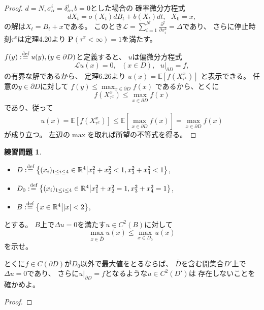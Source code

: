 \documentclass[uplatex]{jsarticle}
\theoremstyle{definition}
\newtheorem{prob}[prob]{練習問題}
\def\R{\mathbb{R}}
\def\P{\mathbf{P}}
\def\E{\mathbb{E}}
\def\mcL{\mathcal{L}}
\def\dfn{:\overset{\mbox{{\scriptsize def}}}{=}}
\begin{document}
\begin{proof}
  \(d = N, \sigma_\alpha^i = \delta_\alpha^i, b=0\)とした場合の
  確率微分方程式
  \[
  dX_t = \sigma (X_t)dB_t + b(X_t)dt, \ \ \ X_0 = x,
  \]
  の解は\(X_t = B_t + x\)である。
  このとき\(\mcL = \sum_{i=1}^N \frac{\partial^2}{\partial x_i^2} = \Delta\)であり、
  さらに停止時刻\(\tau^x\)は定理4.20より
  \(\P(\tau^x < \infty) = 1\)を満たす。

  \(f(y) \dfn u(y) , (y\in \partial D)\)と定義すると、
  \(u\)は偏微分方程式
  \[
  \mcL u(x) = 0, \ \ \ (x\in D), \ \ \ u|_{\partial D} = f,
  \]
  の有界な解であるから、
  定理6.26より
  \(u(x) = \E\left[ f(X_{\tau^x}^x) \right]\)
  と表示できる。
  任意の\(y\in \partial D\)に対して
  \(f(y) \leq \max_{x\in \partial D}f(x)\)
  であるから、とくに
  \[f(X_{\tau^x}^x) \leq \max_{x\in \partial D}f(x)\]
  であり、従って
  \[
  u(x) = \E\left[ f(X_{\tau^x}^x) \right]
  \leq \E\left[ \max_{x\in \partial D}f(x) \right]
  = \max_{x\in \partial D}f(x)
  \]
  が成り立つ。
  左辺の\(\max\)を取れば所望の不等式を得る。
\end{proof}












\begin{prob}\label{prob: 6.8}
  \
  \begin{itemize}
    \item
    \(D \dfn \left\{ (x_i)_{1\leq i \leq 4}\in \R^4 \middle|
    x_1^2 + x_2^2 < 1 , x_3^2 + x_4^2 < 1\right\}\),
    \item
    \(D_0 \dfn \left\{ (x_i)_{1\leq i \leq 4}\in \R^4 \middle|
    x_1^2 + x_2^2 = 1 , x_3^2 + x_4^2 = 1\right\}\),
    \item
    \(B \dfn \left\{ x \in \R^4 \middle| |x| < 2 \right\}\),
  \end{itemize}
  とする。
  \(B\)上で\(\Delta u = 0\)を満たす\(u\in C^2(B)\)に対して
  \[
  \max_{x\in \bar{D}} u(x) \leq \max_{x\in D_0}u(x)
  \]
  を示せ。

  とくに\(f\in C(\partial D)\)が\(D_0\)以外で最大値をとるならば、
  \(\bar{D}\)を含む開集合\(D'\)上で\(\Delta u = 0\)であり、
  さらに\(u|_{\partial D} = f\)となるような\(u\in C^2(D')\)は
  存在しないことを確かめよ。
\end{prob}

\begin{proof}

\end{proof}
\end{document}

